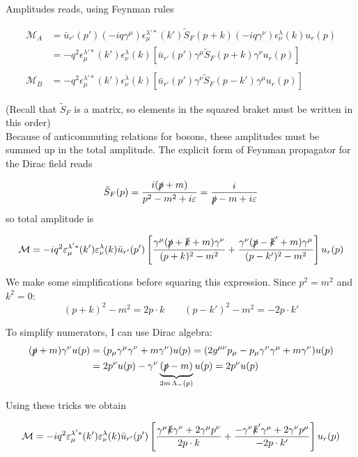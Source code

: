 \documentclass[TheoreticalPhy_ModB.tex]{subfiles}
\begin{document}
\skipline
Amplitudes reads, using Feynman rules

\begin{align*}
\mathcal M_A&=\bar u_{r'}(p')(-iq\gamma^\mu)\epsilon_\mu^{\lambda'*}(k')\tilde S_F(p+k)(-iq\gamma^\nu)\epsilon_\nu^\lambda(k)u_r(p)\\
&=-q^2\epsilon_\mu^{\lambda'*}(k')\epsilon_\nu^\lambda(k)\left[\bar u_{r'}(p')\gamma^\mu\tilde S_F(p+k)\gamma^\nu u_r(p)\right]\\
&\,\\
\mathcal M_B&=-q^2\epsilon_\mu^{\lambda'*}(k')\epsilon_\nu^\lambda(k)\left[\bar u_{r'}(p')\gamma^\nu\tilde S_F(p-k')\gamma^\mu u_r(p)\right]
\end{align*}

{\small (Recall that $\tilde S_F$ is a matrix, so elements in the squared braket  must be written in this order)}\\
Because of anticommuting relations for bosons, these amplitudes must be summed up in the total amplitude.
The explicit form of Feynman propagator for the Dirac field reads

\[\tilde S_F(p)=\frac{i(\slashed p+m)}{p^2-m^2+i\epsilon}=\frac i{\slashed p-m+i\epsilon}\]
so total amplitude is

\[\mathcal M=-iq^2\epsilon_\mu^{\lambda'*}(k')\epsilon_\nu^\lambda(k)\bar u_{r'}(p')\left[\frac{\gamma^\mu(\slashed p+\slashed k+m)\gamma^\nu}{(p+k)^2-m^2}+\frac{\gamma^\nu(\slashed p-\slashed k'+m)\gamma^\mu}{(p-k')^2-m^2}\right]u_r(p)\]

We make some simplifications before squaring  this expression. Since $p^2=m^2$ and $k^2=0$:
\[(p+k)^2-m^2=2p\cdot k\qquad(p-k')^2-m^2=-2p\cdot k'\]

To simplify numerators, I can use Dirac algebra:
\begin{align*} 
(\slashed p+m)\gamma^\nu u(p)&=(p_\mu\gamma^\mu\gamma^\nu+m\gamma^\nu)u(p)=(2g^{\mu\nu}p_\mu-p_\mu\gamma^\nu\gamma^\mu+m\gamma^\nu)u(p)\\
&=2p^\nu u(p)-\gamma^\nu\underbrace{(\slashed p-m)}_{2m\,\Lambda_-(p)}u(p)=2p^\nu u(p)
\end{align*}

Using these tricks we obtain

\[\mathcal M = -iq^2\epsilon_\mu^{\lambda'*}(k')\epsilon_\nu^\lambda(k)\bar u_{r'}(p')\left[\frac{\gamma^\mu\slashed k\gamma^\nu+2\gamma^\mu p^\nu}{2p\cdot k}+\frac{-\gamma^\nu\slashed k'\gamma^\mu+2\gamma^\nu p^\mu}{-2p\cdot k'}\right]u_r(p)\]
\end{document}
